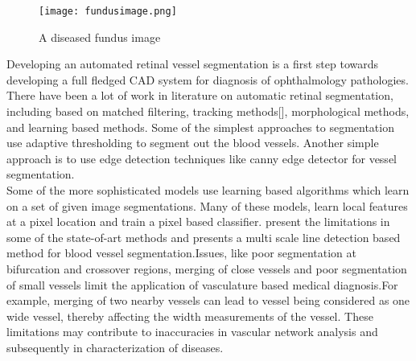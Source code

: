 \begin{figure}
	\centering	
	\texttt{[image: fundusimage.png]}
	\caption{A diseased fundus image}
	\label{fig:fundusdiseased}		
\end{figure}	

Developing an automated retinal vessel segmentation is a first step towards developing a full fledged CAD system for diagnosis of ophthalmology pathologies. There have been a lot of work in literature on automatic retinal segmentation, including based on matched filtering\cite{zana2001segmentation,hoover2000locating,al2007improved}, tracking methods[\cite{mendonca2006segmentation,chutatape1998retinal}], morphological methods\cite{leandro2001blood,walter2001segmentation}, and learning based methods\cite{sopharak2010machine,fuller2007segmentation,niemeijer2007automated}. Some of the simplest approaches to segmentation use adaptive thresholding to segment out the blood vessels\cite{jiang2003adaptive}. Another simple approach is to use edge detection techniques like canny edge detector for vessel segmentation\cite{chrastek2002optic}.\\

Some of the more sophisticated models use learning based algorithms which learn on a set of given image segmentations. Many of these models, learn local features at a pixel location and train a pixel based classifier.\citep{nguyen2011effective} present the limitations in some of the state-of-art methods and presents a multi scale line detection based method for blood vessel segmentation.Issues, like poor segmentation at bifurcation and crossover regions, merging of close vessels and poor segmentation of small vessels limit the application of vasculature based medical diagnosis.For example, merging of two nearby vessels can lead to vessel being considered as one wide vessel, thereby affecting the width measurements of the vessel. These limitations may contribute to inaccuracies in vascular network analysis and subsequently in characterization of diseases. \\

